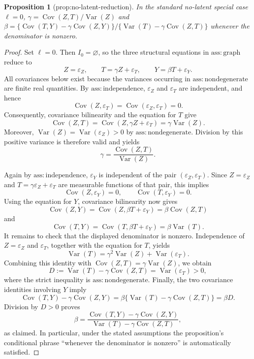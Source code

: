 \documentclass{article}
\newtheorem{proposition}{Proposition}
\begin{document}
\begin{proposition}[prop:no-latent-reduction]\label{prop:no-latent-reduction}
In the standard no-latent special case \(\ell=0\), \(\gamma=\operatorname{Cov}(Z,T)/\operatorname{Var}(Z)\) and \(\beta=\{\operatorname{Cov}(T,Y)-\gamma\operatorname{Cov}(Z,Y)\}/\{\operatorname{Var}(T)-\gamma\operatorname{Cov}(Z,T)\}\) whenever the denominator is nonzero.
\end{proposition}
\begin{proof}
Set \(\ell=0\).  Then \(I_0=\varnothing\), so the three structural equations in \(\mathrm{ass{:}graph}\) reduce to
\[
 Z=\varepsilon_Z,\qquad
 T=\gamma Z+\varepsilon_T,\qquad
 Y=\beta T+\varepsilon_Y.
\]
All covariances below exist because the variances occurring in \(\mathrm{ass{:}nondegenerate}\) are finite real quantities.  By \(\mathrm{ass{:}independence}\), \(\varepsilon_Z\) and \(\varepsilon_T\) are independent, and hence
\[
 \operatorname{Cov}(Z,\varepsilon_T)
 =\operatorname{Cov}(\varepsilon_Z,\varepsilon_T)=0.
\]
Consequently, covariance bilinearity and the equation for \(T\) give
\[
 \operatorname{Cov}(Z,T)
 =\operatorname{Cov}(Z,\gamma Z+\varepsilon_T)
 =\gamma\operatorname{Var}(Z).
\]
Moreover, \(\operatorname{Var}(Z)=\operatorname{Var}(\varepsilon_Z)>0\) by \(\mathrm{ass{:}nondegenerate}\).  Division by this positive variance is therefore valid and yields
\[
 \gamma=\frac{\operatorname{Cov}(Z,T)}{\operatorname{Var}(Z)}.
\]

Again by \(\mathrm{ass{:}independence}\), \(\varepsilon_Y\) is independent of the pair \((\varepsilon_Z,\varepsilon_T)\).  Since \(Z=\varepsilon_Z\) and \(T=\gamma\varepsilon_Z+\varepsilon_T\) are measurable functions of that pair, this implies
\[
 \operatorname{Cov}(Z,\varepsilon_Y)=0,
 \qquad
 \operatorname{Cov}(T,\varepsilon_Y)=0.
\]
Using the equation for \(Y\), covariance bilinearity now gives
\[
 \operatorname{Cov}(Z,Y)
 =\operatorname{Cov}(Z,\beta T+\varepsilon_Y)
 =\beta\operatorname{Cov}(Z,T)
\]
and
\[
 \operatorname{Cov}(T,Y)
 =\operatorname{Cov}(T,\beta T+\varepsilon_Y)
 =\beta\operatorname{Var}(T).
\]
It remains to check that the displayed denominator is nonzero.  Independence of \(Z=\varepsilon_Z\) and \(\varepsilon_T\), together with the equation for \(T\), yields
\[
 \operatorname{Var}(T)
 =\gamma^2\operatorname{Var}(Z)+\operatorname{Var}(\varepsilon_T).
\]
Combining this identity with \(\operatorname{Cov}(Z,T)=\gamma\operatorname{Var}(Z)\), we obtain
\[
 D:=\operatorname{Var}(T)-\gamma\operatorname{Cov}(Z,T)
 =\operatorname{Var}(\varepsilon_T)>0,
\]
where the strict inequality is \(\mathrm{ass{:}nondegenerate}\).  Finally, the two covariance identities involving \(Y\) imply
\[
 \operatorname{Cov}(T,Y)-\gamma\operatorname{Cov}(Z,Y)
 =\beta\bigl\{\operatorname{Var}(T)-\gamma\operatorname{Cov}(Z,T)\bigr\}
 =\beta D.
\]
Division by \(D>0\) proves
\[
 \beta
 =\frac{\operatorname{Cov}(T,Y)-\gamma\operatorname{Cov}(Z,Y)}
 {\operatorname{Var}(T)-\gamma\operatorname{Cov}(Z,T)},
\]
as claimed.  In particular, under the stated assumptions the proposition's conditional phrase ``whenever the denominator is nonzero'' is automatically satisfied.
\end{proof}
\end{document}
